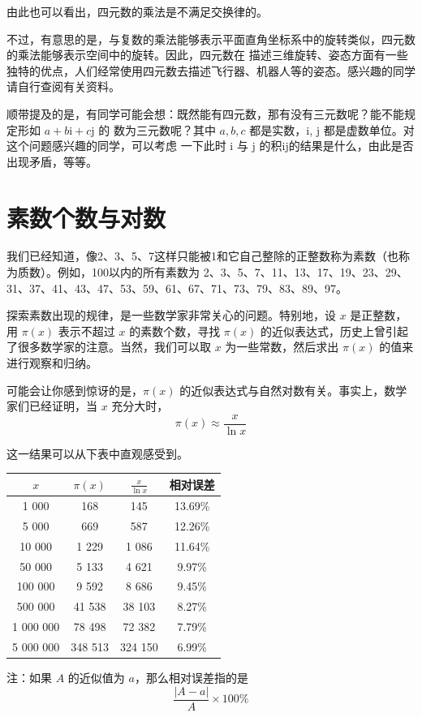 \documentclass[a4paper,openany]{ctexbook}
\begin{document}
由此也可以看出，四元数的乘法是不满足交换律的。

不过，有意思的是，与复数的乘法能够表示平面直角坐标系中的旋转类似，四元数的乘法能够表示空间中的旋转。因此，四元数在
描述三维旋转、姿态方面有一些独特的优点，人们经常使用四元数去描述飞行器、机器人等的姿态。感兴趣的同学请自行查阅有关资料。

顺带提及的是，有同学可能会想：既然能有四元数，那有没有三元数呢？能不能规定形如 \(a + b\mathrm{i} + c\mathrm{j}\) 的
数为三元数呢？其中 \(a, b, c\) 都是实数，$\mathrm{i}$, $\mathrm{j}$ 都是虚数单位。对这个问题感兴趣的同学，可以考虑
一下此时 $\mathrm{i}$ 与 $\mathrm{j}$ 的积$\mathrm{i}\mathrm{j}$的结果是什么，由此是否出现矛盾，等等。

\section{素数个数与对数}

我们已经知道，像2、3、5、7这样只能被1和它自己整除的正整数称为素数（也称为质数）。例如，100以内的所有素数为
2、3、5、7、11、13、17、19、23、29、31、37、41、43、47、53、59、61、67、71、73、79、83、89、97。

探索素数出现的规律，是一些数学家非常关心的问题。特别地，设 \( x \) 是正整数，用 \(\pi(x)\) 表示不超过 \( x \) 的素数个数，寻找 \(\pi(x)\) 的近似表达式，历史上曾引起了很多数学家的注意。当然，我们可以取 \( x \) 为一些常数，然后求出 \(\pi(x)\) 的值来进行观察和归纳。

可能会让你感到惊讶的是，\(\pi(x)\) 的近似表达式与自然对数有关。事实上，数学家们已经证明，当 \( x \) 充分大时，
\[\pi(x) \approx \frac{x}{\ln x}\]

这一结果可以从下表中直观感受到。

\begin{table}[h]
    \centering
    \begin{tabular}{cccc}
        \toprule
        \( x \)   & \(\pi(x)\) & \(\frac{x}{\ln x}\) & 相对误差 \\
        \midrule
        1 000     & 168        & 145                 & 13.69\%  \\
        5 000     & 669        & 587                 & 12.26\%  \\
        10 000    & 1 229      & 1 086               & 11.64\%  \\
        50 000    & 5 133      & 4 621               & 9.97\%   \\
        100 000   & 9 592      & 8 686               & 9.45\%   \\
        500 000   & 41 538     & 38 103              & 8.27\%   \\
        1 000 000 & 78 498     & 72 382              & 7.79\%   \\
        5 000 000 & 348 513    & 324 150             & 6.99\%   \\
        \bottomrule
    \end{tabular}
\end{table}

注：如果 \( A \) 的近似值为 \( a \)，那么相对误差指的是
\[\frac{|A-a|}{A} \times 100\%\]

\listoftheorems[ignoreall,show={thmlevel1},title=定理索引]

\printindex
\end{document}
